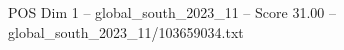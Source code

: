 \begin{textsample}{POS Dim 1 – global\_south\_2023\_11 – Score 31.00 – global\_south\_2023\_11/103659034.txt}
\end{textsample}
